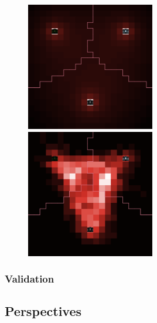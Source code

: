 \begin{figure}
\includegraphics[width=0.5\textwidth]{Figures/PartII/Modeling/Lutecia/_MEAN_ACC}
\includegraphics[width=0.5\textwidth]{Figures/PartII/Modeling/Lutecia/_NW_FREQ}
\caption[Validation of network exploration heuristic]{}
\end{figure}



\subsubsection{Validation}


\subsection{Perspectives}










